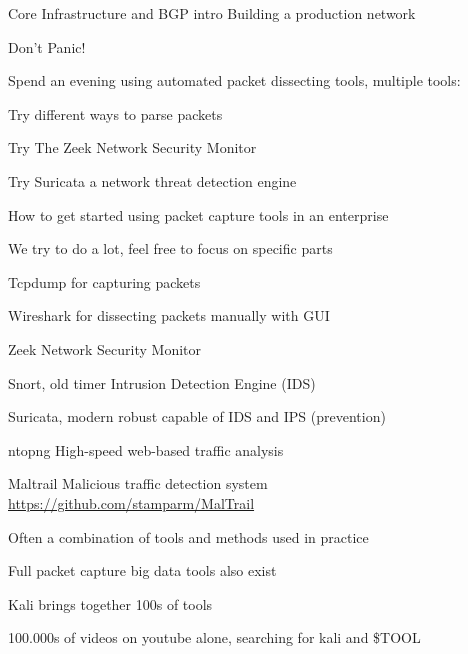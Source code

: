 \documentclass[20pt,landscape,a4paper,footrule]{foils}
\begin{document}
\rm
{}
\mytitlepage
{Core Infrastructure and BGP intro}
{Building a production network}

\LogoOn




\centerline{\color{titlecolor}\LARGE Don't Panic!}

Spend an evening using automated packet dissecting tools, multiple tools:
\begin{list1}
\item Try different ways to parse packets
\item Try The Zeek Network Security Monitor
\item Try Suricata a network threat detection engine
\item How to get started using packet capture tools in an enterprise
\end{list1}

\centerline{We try to do a lot, feel free to focus on specific parts}


\begin{list1}
\item Tcpdump for capturing packets
\item Wireshark for dissecting packets manually with GUI
\item Zeek Network Security Monitor
\item Snort, old timer Intrusion Detection Engine (IDS)
\item Suricata, modern robust capable of IDS and IPS (prevention)
\item ntopng High-speed web-based traffic analysis
\item Maltrail Malicious traffic detection system \url{https://github.com/stamparm/MalTrail}
\end{list1}

\vskip 5mm
\centerline{Often a combination of tools and methods used in practice}

Full packet capture big data tools also exist



\begin{list1}
\item Kali  brings together 100s of tools
\item 100.000s of videos on youtube alone, searching for kali and \$TOOL
\end{list1}
\end{document}
